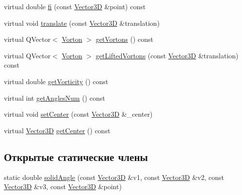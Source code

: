 \begin{DoxyCompactItemize}
virtual double \mbox{\hyperlink{class_multi_frame_ac9aa5421ef5127a6465a2ead23b97c78}{fi}} (const \mbox{\hyperlink{class_vector3_d}{Vector3D}} \&point) const
\item 
virtual void \mbox{\hyperlink{class_multi_frame_aa572cc6695d008943b4f3f4e585742e4}{translate}} (const \mbox{\hyperlink{class_vector3_d}{Vector3D}} \&translation)
\item 
virtual Q\+Vector$<$ \mbox{\hyperlink{class_vorton}{Vorton}} $>$ \mbox{\hyperlink{class_multi_frame_a33c0682a1b9c8966c52f8c1274febde2}{get\+Vortons}} () const
\item 
virtual Q\+Vector$<$ \mbox{\hyperlink{class_vorton}{Vorton}} $>$ \mbox{\hyperlink{class_multi_frame_a676285039ba30dd258b04104b2139f90}{get\+Lifted\+Vortons}} (const \mbox{\hyperlink{class_vector3_d}{Vector3D}} \&translation) const
\item 
virtual double \mbox{\hyperlink{class_multi_frame_aec90f5195c25d12a0caae0cf0fd27864}{get\+Vorticity}} () const
\item 
virtual int \mbox{\hyperlink{class_multi_frame_a6ac6294e45d6337e72d91cec60080ff4}{get\+Angles\+Num}} () const
\item 
virtual void \mbox{\hyperlink{class_multi_frame_a7a89904f35c2d3e87f38e9c207a58f61}{set\+Center}} (const \mbox{\hyperlink{class_vector3_d}{Vector3D}} \&\+\_\+center)
\item 
virtual \mbox{\hyperlink{class_vector3_d}{Vector3D}} \mbox{\hyperlink{class_multi_frame_a60bcd87f0a269b421ad4539325898bd7}{get\+Center}} () const
\end{DoxyCompactItemize}
\subsection*{Открытые статические члены}
\begin{DoxyCompactItemize}
\item 
static double \mbox{\hyperlink{class_multi_frame_aa7f6c2151ad01f190edd3757f5ef8162}{solid\+Angle}} (const \mbox{\hyperlink{class_vector3_d}{Vector3D}} \&v1, const \mbox{\hyperlink{class_vector3_d}{Vector3D}} \&v2, const \mbox{\hyperlink{class_vector3_d}{Vector3D}} \&v3, const \mbox{\hyperlink{class_vector3_d}{Vector3D}} \&point)
\end{DoxyCompactItemize}
